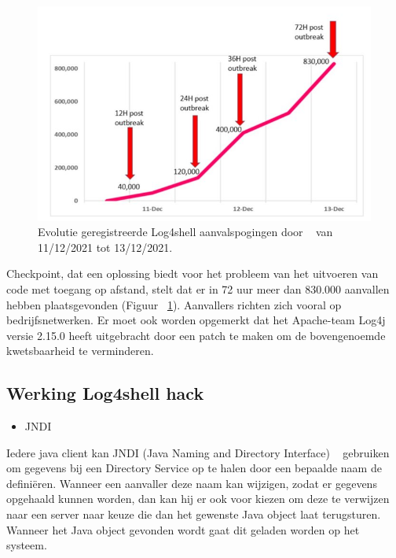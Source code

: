 \documentclass{hogent-article}
\begin{document}
\begin{figure}[!ht]
    \centering
    \includegraphics[width=1\linewidth]{img/aanvallen72h.png}
    \caption{Evolutie geregistreerde Log4shell aanvalspogingen door ~\textcite{Checkpoint2021} van 11/12/2021 tot 13/12/2021.}
    \label{fig:aanvallen72h}
\end{figure}
Checkpoint, dat een oplossing biedt voor het probleem van het uitvoeren van code met toegang op afstand, stelt dat er in 72 uur meer dan 830.000 aanvallen hebben plaatsgevonden (Figuur ~\ref{fig:aanvallen72h}). Aanvallers richten zich vooral op bedrijfsnetwerken. Er moet ook worden opgemerkt dat het Apache-team Log4j versie 2.15.0 heeft uitgebracht door een patch te maken om de bovengenoemde kwetsbaarheid te verminderen.

\subsection{Werking Log4shell hack}

\begin{itemize}[leftmargin=*]
    \item JNDI
\end{itemize}

Iedere java client kan JNDI (Java Naming and Directory Interface) ~\autocite{Oracle2020} gebruiken om gegevens bij een Directory Service op te halen door een bepaalde naam de definiëren.
Wanneer een aanvaller deze naam kan wijzigen, zodat er gegevens opgehaald kunnen worden, dan kan hij er ook voor kiezen om deze te verwijzen naar een server naar keuze die dan het gewenste Java object laat terugsturen. Wanneer het Java object gevonden wordt gaat dit geladen worden op het systeem.
\end{document}
